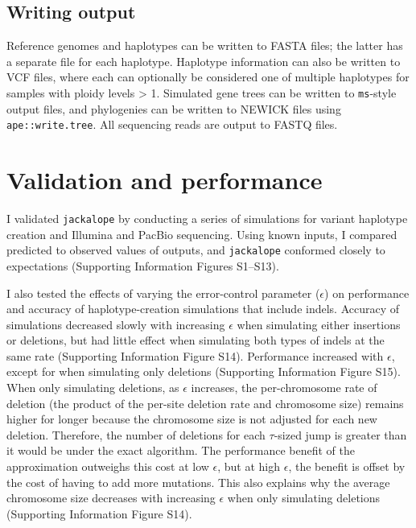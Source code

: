 \documentclass[12pt,]{article}
\begin{document}
\hypertarget{writing-output}{%
\subsection{Writing output}\label{writing-output}}

Reference genomes and haplotypes can be written to FASTA files; the latter
has a separate file for each haplotype.
Haplotype information can also be written to VCF files, where each can
optionally be considered one of multiple haplotypes for samples with ploidy levels \textgreater{} 1.
Simulated gene trees can be written to \texttt{ms}-style output files, and phylogenies can be
written to NEWICK files using \texttt{ape::write.tree}.
All sequencing reads are output to FASTQ files.

\hypertarget{validation-and-performance}{%
\section{Validation and performance}\label{validation-and-performance}}

I validated \texttt{jackalope} by conducting a series of simulations for variant haplotype
creation and Illumina and PacBio sequencing.
Using known inputs, I compared predicted to observed values of outputs,
and \texttt{jackalope} conformed closely to expectations
(Supporting Information Figures S1--S13).

I also tested the effects of varying the error-control parameter (\(\epsilon\)) on
performance and accuracy of haplotype-creation simulations that include indels.
Accuracy of simulations decreased slowly with increasing \(\epsilon\) when simulating
either insertions or deletions, but had little effect when simulating both types of
indels at the same rate (Supporting Information Figure S14).
Performance increased with \(\epsilon\), except for when simulating only deletions
(Supporting Information Figure S15).
When only simulating deletions, as \(\epsilon\) increases, the per-chromosome rate of
deletion (the product of the per-site deletion rate and chromosome size) remains
higher for longer because the chromosome size is not adjusted for each new deletion.
Therefore, the number of deletions for each \(\tau\)-sized jump is greater than
it would be under the exact algorithm.
The performance benefit of the approximation outweighs this cost at low \(\epsilon\),
but at high \(\epsilon\), the benefit is offset by the cost of having to add more mutations.
This also explains why the average chromosome size decreases with increasing \(\epsilon\)
when only simulating deletions (Supporting Information Figure S14).
\end{document}
